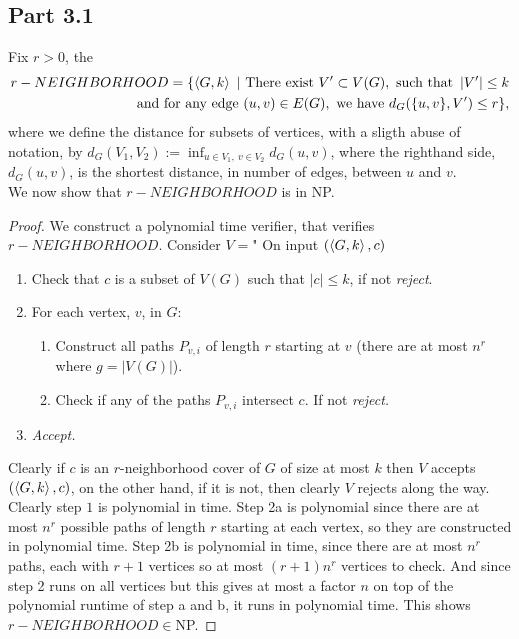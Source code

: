 \documentclass[a4paper,11pt]{article}
\newcommand{\abs}[1]{\left\lvert #1 \right\rvert}
\newcommand{\pipe}{\ \vert \ }
\numberwithin{equation}{section}
\begin{document}
\subsection*{Part 3.1}
Fix $ r>0 $, the \begin{equation*}
	\begin{aligned}
	r-NEIGHBORHOOD=\{\braket{G,k}\pipe \text{There exist }V'\subset V(G),\text{ such that }\abs{V'}\leq k\\ \text{ and for any edge } (u,v)\in E(G), \text{ we have } d_G(\{u,v\},V')\leq r \},
	\end{aligned}
\end{equation*}
where we define the distance for subsets of vertices, with a sligth abuse of notation, by $ d_G(V_1,V_2):=\inf_{u\in V_1,\ v\in V_2} d_G(u,v) $, where the righthand side, $ d_G(u,v) $, is the shortest distance, in number of edges, between $ u $ and $ v $.\\
We now show that $ r-NEIGHBORHOOD $ is in NP.\begin{proof}
	We construct a polynomial time verifier, that verifies $ r-NEIGHBORHOOD $. Consider $ V= $" On input $ (\braket{G,k},c) $\begin{enumerate}
		\item Check that $ c $ is a subset of $ V(G) $ such that $ \abs{c}\leq k $, if not \emph{reject}.
		\item For each vertex, $ v $, in $ G $:
		\begin{enumerate}
			\item Construct all paths $ P_{v,i} $ of length $ r $ starting at $ v $ (there are at most $ n^r $ where $ g=\abs{V(G)} $).
			\item Check if any of the paths $ P_{v,i} $ intersect $ c $. If not \emph{reject.}
		\end{enumerate} 
		\item\emph{Accept.}
	\end{enumerate}
	Clearly if $ c $ is an $ r $-neighborhood cover of $ G $ of size at most $ k $ then $ V $ accepts $ (\braket{G,k},c) $, on the other hand, if it is not, then clearly $ V $ rejects along the way. Clearly step $ 1 $ is polynomial in time. Step 2a is polynomial since there are at most $ n^r $ possible paths of length $ r $ starting at each vertex, so they are constructed in polynomial time. Step 2b is polynomial in time, since there are at most $ n^r $ paths, each with $ r+1 $ vertices so at most $ (r+1)n^r $ vertices to check. And since step 2 runs on all vertices but this gives at most a factor $ n $ on top of the polynomial runtime of step a and b, it runs in polynomial time. This shows $ r-NEIGHBORHOOD\in $NP.
\end{proof}
\end{document}
